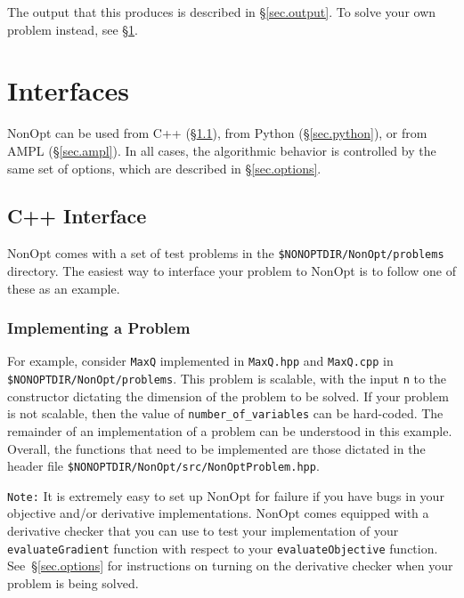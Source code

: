 \documentclass{article}
\begin{document}
The output that this produces is described in \S\ref{sec.output}.  To solve your own problem instead, see \S\ref{sec.interfaces}.

\section{Interfaces}\label{sec.interfaces}

NonOpt can be used from C++ (\S\ref{sec.cpp}), from Python (\S\ref{sec.python}), or from AMPL (\S\ref{sec.ampl}).  In all cases, the algorithmic behavior is controlled by the same set of options, which are described in \S\ref{sec.options}.

\subsection{C++ Interface}\label{sec.cpp}

NonOpt comes with a set of test problems in the \texttt{\$NONOPTDIR/NonOpt/problems} directory.  The easiest way to interface your problem to NonOpt is to follow one of these as an example.

\subsubsection{Implementing a Problem}

For example, consider \texttt{MaxQ} implemented in \texttt{MaxQ.hpp} and \texttt{MaxQ.cpp} in \texttt{\$NONOPTDIR/NonOpt/problems}.  This problem is scalable, with the input \texttt{n} to the constructor dictating the dimension of the problem to be solved.  If your problem is not scalable, then the value of \texttt{number\_of\_variables} can be hard-coded. The remainder of an implementation of a problem can be understood in this example.  Overall, the functions that need to be implemented are those dictated in the header file \texttt{\$NONOPTDIR/NonOpt/src/NonOptProblem.hpp}.

\texttt{Note:} It is extremely easy to set up NonOpt for failure if you have bugs in your objective and/or
derivative implementations.  NonOpt comes equipped with a derivative checker that you can use to test your
implementation of your \texttt{evaluateGradient} function with respect to your \texttt{evaluateObjective} function.  See~\S\ref{sec.options} for instructions on turning on the derivative checker when your problem is being solved.
\end{document}
